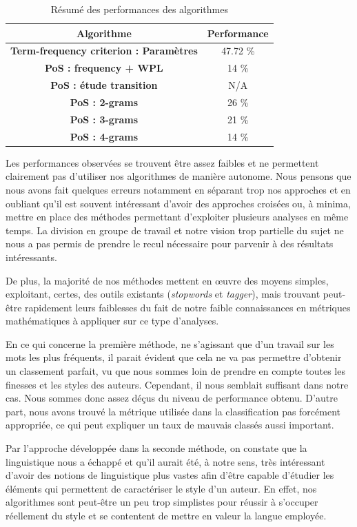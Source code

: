 \documentclass[a4paper,12pt]{report}
\begin{document}
\begin{table}[H]
\centering
\begin{tabular}{|c|c|}
\hline \textbf{Algorithme} & \textbf{Performance} \\ 
\hline 
\textbf{Term-frequency criterion : Paramètres} & 47.72 \%  \\ 
\hline 
\textbf{PoS : frequency + WPL} & 14 \% \\ 
\hline 
\textbf{PoS : étude transition} & N/A \\ 
\hline 
\textbf{PoS : 2-grams} & 26 \% \\ 
\hline 
\textbf{PoS : 3-grams} & 21 \% \\ 
\hline 
\textbf{PoS : 4-grams} & 14 \% \\ 
\hline 
\end{tabular} 
\caption{Résumé des performances des algorithmes}
\end{table}

Les performances observées se trouvent être assez faibles et ne permettent clairement pas d'utiliser nos algorithmes de manière autonome. Nous pensons que nous avons fait quelques erreurs notamment en séparant trop nos approches et en oubliant qu'il est souvent intéressant d'avoir des approches croisées ou, à minima, mettre en place des méthodes permettant d'exploiter plusieurs analyses en même temps. La division en groupe de travail et notre vision trop partielle du sujet ne nous a pas permis de prendre le recul nécessaire pour parvenir à des résultats intéressants.

De plus, la majorité de nos méthodes mettent en œuvre des moyens simples, exploitant, certes, des outils existants (\textit{stopwords} et \textit{tagger}), mais trouvant peut-être rapidement leurs faiblesses du fait de notre faible connaissances en métriques mathématiques à appliquer sur ce type d'analyses.

En ce qui concerne la première méthode, ne s'agissant que d'un travail sur les mots les plus fréquents, il parait évident que cela ne va pas permettre d'obtenir un classement parfait, vu que nous sommes loin de prendre en compte toutes les finesses et les styles des auteurs. Cependant, il nous semblait suffisant dans notre cas. Nous sommes donc assez déçus du niveau de performance obtenu. D'autre part, nous avons trouvé la métrique utilisée dans la classification pas forcément appropriée, ce qui peut expliquer un taux de mauvais classés aussi important.

Par l'approche développée dans la seconde méthode, on constate que la linguistique nous a échappé et qu'il aurait été, à notre sens, très intéressant d'avoir des notions de linguistique plus vastes afin d'être capable d'étudier les éléments qui permettent de caractériser le style d'un auteur. En effet, nos algorithmes sont peut-être un peu trop simplistes pour réussir à s'occuper réellement du style et se contentent de mettre en valeur la langue employée.
\end{document}
